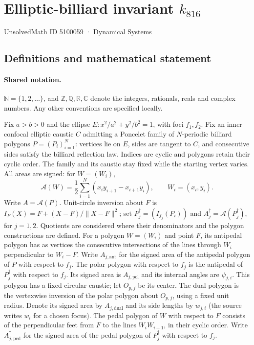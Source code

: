 \documentclass[11pt]{article}
\begin{document}
\setcounter{section}{5100058}
\section{Elliptic-billiard invariant $k_{816}$}\label{5100059}
{\small\sffamily UnsolvedMath ID 5100059 · Dynamical Systems}
\subsection{Definitions and mathematical statement}

\paragraph{Shared notation.}$\mathbb N=\{1,2,\ldots\}$, and $\mathbb Z,\mathbb Q,\mathbb R,\mathbb C$ denote the integers, rationals, reals and complex numbers. Any other conventions are specified locally.


Fix $a>b>0$ and the ellipse $E:x^2/a^2+y^2/b^2=1$, with foci $f_1,f_2$. Fix an inner confocal elliptic caustic $C$ admitting a Poncelet family of $N$-periodic billiard polygons $P=(P_i)_{i=1}^N$: vertices lie on $E$, sides are tangent to $C$, and consecutive sides satisfy the billiard reflection law. Indices are cyclic and polygons retain their cyclic order. The family and its caustic stay fixed while the starting vertex varies. All areas are signed: for $W=(W_i)$,
\[\mathcal A(W)=\frac12\sum_{i=1}^N(x_i y_{i+1}-x_{i+1}y_i),\qquad W_i=(x_i,y_i).\]
Write $A=\mathcal A(P)$. Unit-circle inversion about $F$ is $I_F(X)=F+(X-F)/\lVert X-F\rVert^2$; set $P_j^\dagger=(I_{f_j}(P_i))$ and $A_j^\dagger=\mathcal A(P_j^\dagger)$, for $j=1,2$. Quotients are considered where their denominators and the polygon constructions are defined. For a polygon $W=(W_i)$ and point $F$, its antipedal polygon has as vertices the consecutive intersections of the lines through $W_i$ perpendicular to $W_i-F$. Write $A_{j,\mathrm{ant}}$ for the signed area of the antipedal polygon of $P$ with respect to $f_j$. The polar polygon with respect to $f_j$ is the antipedal of $P_j^\dagger$ with respect to $f_j$. Its signed area is $A_{j,\mathrm{pol}}$ and its internal angles are $\psi_{j,i}$. This polygon has a fixed circular caustic; let $O_{p,j}$ be its center. The dual polygon is the vertexwise inversion of the polar polygon about $O_{p,j}$, using a fixed unit radius. Denote its signed area by $A_{j,\mathrm{dual}}$ and its side lengths by $w_{j,i}$ (the source writes $w_i$ for a chosen focus). The pedal polygon of $W$ with respect to $F$ consists of the perpendicular feet from $F$ to the lines $W_iW_{i+1}$, in their cyclic order. Write $A_{j,\mathrm{ped}}^\dagger$ for the signed area of the pedal polygon of $P_j^\dagger$ with respect to $f_j$.
\end{document}
